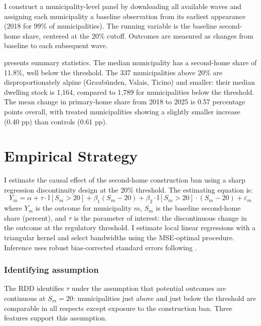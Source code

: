 \documentclass[12pt]{article}
\newcommand{\ind}{\mathbb{I}}
\begin{document}
I construct a municipality-level panel by downloading all available waves and assigning each municipality a baseline observation from its earliest appearance (2018 for 99\% of municipalities). The running variable is the baseline second-home share, centered at the 20\% cutoff. Outcomes are measured as changes from baseline to each subsequent wave.

 presents summary statistics. The median municipality has a second-home share of 11.8\%, well below the threshold. The 337 municipalities above 20\% are disproportionately alpine (Graubünden, Valais, Ticino) and smaller: their median dwelling stock is 1,164, compared to 1,789 for municipalities below the threshold. The mean change in primary-home share from 2018 to 2025 is 0.57 percentage points overall, with treated municipalities showing a slightly smaller increase (0.40 pp) than controls (0.61 pp).



\section{Empirical Strategy}

I estimate the causal effect of the second-home construction ban using a sharp regression discontinuity design at the 20\% threshold. The estimating equation is:
\begin{equation}
Y_m = \alpha + \tau \cdot \ind[S_m > 20] + \beta_1 (S_m - 20) + \beta_2 \cdot \ind[S_m > 20] \cdot (S_m - 20) + \varepsilon_m
\label{eq:rdd}
\end{equation}
where $Y_m$ is the outcome for municipality $m$, $S_m$ is the baseline second-home share (percent), and $\tau$ is the parameter of interest: the discontinuous change in the outcome at the regulatory threshold. I estimate local linear regressions with a triangular kernel and select bandwidths using the \citet{cattaneo2020practical} MSE-optimal procedure. Inference uses robust bias-corrected standard errors following \citet{cattaneo2020practical}.

\subsubsection*{Identifying assumption} The RDD identifies $\tau$ under the assumption that potential outcomes are continuous at $S_m = 20$: municipalities just above and just below the threshold are comparable in all respects except exposure to the construction ban. Three features support this assumption.
\end{document}
